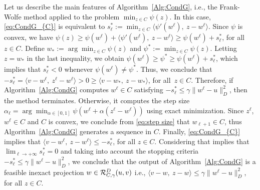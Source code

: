 Let us  describe the main features of  Algorithm~\ref{Alg:CondG}, i.e.,  the  Frank-Wolfe method applied to the problem $\min_{z \in C}\psi(z)$.   In this case,  \eqref{eq:CondG_{C}} is equivalent to $s_{\ell}^*:=\min_{z \in C}\langle \psi'(w^\ell) ,~z-w^\ell\rangle$. Since $\psi$ is convex, we have $\psi(z)\geq \psi(w^\ell) + \langle \psi'(w^\ell) ,~z-w^\ell\rangle\geq    \psi(w^\ell)  +   s_{\ell}^*$, for all $z\in C$. Define  $ w_*:=\arg \min_{z \in C}\psi(z)$ and  $\psi^*:= \min_{z \in C}\psi(z)$. Letting $z= w_*$ in the last inequality,  we obtain $\psi(w^\ell)\geq \psi^* \geq \psi(w^\ell)  +   s_{\ell}^*$, which implies that $s_{\ell}^*< 0$ whenever $\psi(w^\ell)\neq \psi^*$. Thus, we conclude that  $-s_{\ell}^*=\langle  v-w^\ell, ~z^\ell-w^\ell \rangle>0\geq  \langle  v-w_*, ~z-w_* \rangle$,  for all~$z\in C$.   Therefore, if  Algorithm~\ref{Alg:CondG} computes  $w^\ell \in C$ satisfying $-s_{\ell}^*\leq  \gamma \|w^{\ell}-u\|_{D}^2$, then the method terminates. Otherwise, it computes the step size $\alpha_\ell = \arg\min_{\alpha \in [0,1]} \psi(w^\ell + \alpha(z^\ell - w^\ell))$  using exact minimization.  Since $z^\ell$, $w^\ell \in C$  and $C$ is convex, we conclude from  \eqref{eq:step size}  that $w_{\ell+1} \in C$, thus  Algorithm~\ref{Alg:CondG}  generates a sequence in $C$.  Finally,   \eqref{eq:CondG_{C}} implies that  $\langle  v-w^\ell, ~z-w^\ell\rangle\leq -s_{\ell}^*$, for all  $ z\in C$.  Considering that   \cite[Proposition A.2]{BeckTeboulle2004}  implies that $\lim_{\ell \to +\infty}s_{\ell}^*=0$ and taking into account   the  stopping criteria     $-s_{\ell}^*\leq \gamma \|w^{\ell}-u\|_{D}^2$, we conclude that the output of  Algorithm~\ref{Alg:CondG} is  a feasible inexact projection $w\in {\cal R}_{C, \gamma}^{D}(u,v)$ i.e.,   $\langle  v-w, ~z-w\rangle\leq   \gamma \|w^{\ell}-u\|_{D}^2$, for all $z\in C$.


